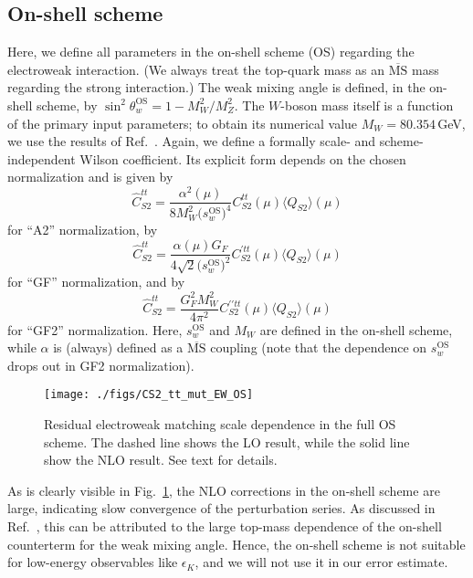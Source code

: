 \documentclass[letter,11pt,DIV=12,abstract=true,numbers=noenddot,titlepage=false,twocolumn=false,draft=false]{scrartcl}
\newcommand{\MS}{$\overline{\text{MS}}$}
\begin{document}
\subsection{On-shell scheme}

Here, we define all parameters in the on-shell scheme (OS) regarding
the electroweak interaction. (We always treat the top-quark mass as an
\MS{} mass regarding the strong interaction.) The weak mixing angle is
defined, in the on-shell scheme, by $\sin^2\theta_w^\text{OS} = 1 -
M_W^2/M_Z^2$. The $W$-boson mass itself is a function of the primary
input parameters; to obtain its numerical value $M_W = 80.354\,$GeV,
we use the results of Ref.~\cite{Awramik:2003rn}. Again, we define a
formally scale- and scheme-independent Wilson coefficient. Its
explicit form depends on the chosen normalization and is given by
\begin{equation}
  \hat C_{S2}^{tt} =
  \frac{\alpha^2(\mu)}{8 M_W^2 \big(s_w^{\text{OS}}\big)^4}
  C_{S2}^{tt}(\mu) \langle Q_{S2}\rangle (\mu)
\end{equation}
for ``A2'' normalization, by
\begin{equation}
  \hat C_{S2}^{tt} =
  \frac{\alpha(\mu) G_F}{4\sqrt{2} \big(s_w^{\text{OS}}\big)^2}
  C_{S2}^{\prime tt}(\mu) \langle Q_{S2}\rangle (\mu)
\end{equation}
for ``GF'' normalization, and by
\begin{equation}
  \hat C_{S2}^{tt} =
  \frac{G_F^2 M_W^2}{4\pi^2}
  C_{S2}^{\prime \prime tt}(\mu) \langle Q_{S2}\rangle (\mu)
\end{equation}
for ``GF2'' normalization. Here, $s_w^{\text{OS}}$ and $M_W$ are
defined in the on-shell scheme, while $\alpha$ is (always) defined as
a \MS{} coupling (note that the dependence on $s_w^{\text{OS}}$ drops
out in GF2 normalization).

\begin{figure}[t]
        \centering
        \texttt{[image: ./figs/CS2\_tt\_mut\_EW\_OS]}
        \caption{Residual electroweak matching scale dependence in the
          full OS scheme. The dashed line shows the LO result, while
          the solid line show the NLO result. See text for details.
	\label{fig:os}}
\end{figure}

As is clearly visible in Fig.~\ref{fig:os}, the NLO corrections in the
on-shell scheme are large, indicating slow convergence of the
perturbation series. As discussed in Ref.~\cite{Bobeth:2013tba}, this
can be attributed to the large top-mass dependence of the on-shell
counterterm for the weak mixing angle. Hence, the on-shell scheme is
not suitable for low-energy observables like $\epsilon_K$, and we will
not use it in our error estimate.
\end{document}

